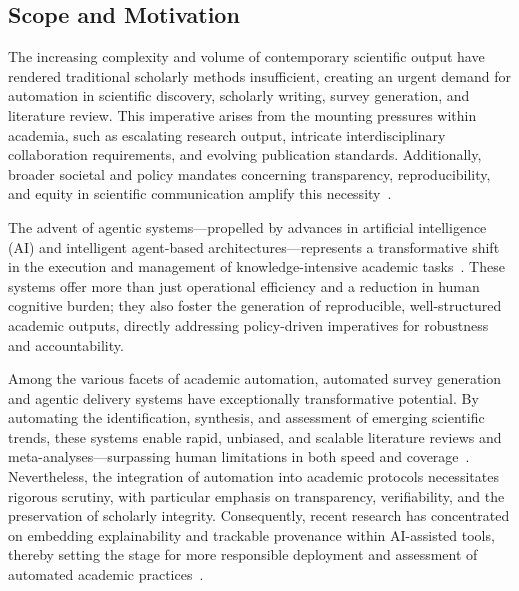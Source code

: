 \documentclass[11pt]{article}
\begin{document}
\subsection{Scope and Motivation}

The increasing complexity and volume of contemporary scientific output have rendered traditional scholarly methods insufficient, creating an urgent demand for automation in scientific discovery, scholarly writing, survey generation, and literature review. This imperative arises from the mounting pressures within academia, such as escalating research output, intricate interdisciplinary collaboration requirements, and evolving publication standards. Additionally, broader societal and policy mandates concerning transparency, reproducibility, and equity in scientific communication amplify this necessity~\cite{ref106,ref111}. 

The advent of agentic systems—propelled by advances in artificial intelligence (AI) and intelligent agent-based architectures—represents a transformative shift in the execution and management of knowledge-intensive academic tasks~\cite{ref16,ref106,ref111}. These systems offer more than just operational efficiency and a reduction in human cognitive burden; they also foster the generation of reproducible, well-structured academic outputs, directly addressing policy-driven imperatives for robustness and accountability.

Among the various facets of academic automation, automated survey generation and agentic delivery systems have exceptionally transformative potential. By automating the identification, synthesis, and assessment of emerging scientific trends, these systems enable rapid, unbiased, and scalable literature reviews and meta-analyses—surpassing human limitations in both speed and coverage~\cite{ref106,ref111}. Nevertheless, the integration of automation into academic protocols necessitates rigorous scrutiny, with particular emphasis on transparency, verifiability, and the preservation of scholarly integrity. Consequently, recent research has concentrated on embedding explainability and trackable provenance within AI-assisted tools, thereby setting the stage for more responsible deployment and assessment of automated academic practices~\cite{ref101,ref102,ref103,ref104,ref105,ref106}.
\end{document}
